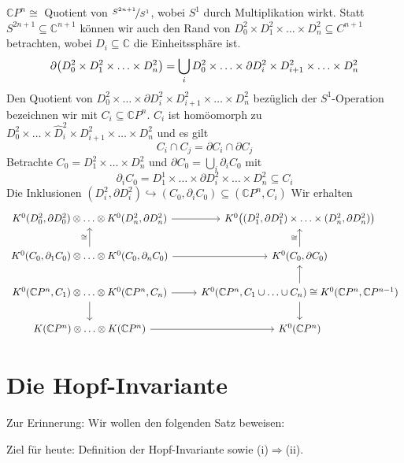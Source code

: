 $\mathds{C}P^n \cong$ Quotient von $\nicefrac{S^{2n+1}}{S^1}$, wobei $S^1$ durch Multiplikation wirkt. Statt $S^{2n+1} \subseteq \mathds{C}^{n+1}$ können wir auch den Rand
von $D_0^2 \times D_1^2 \times \ldots \times D_n^2 \subseteq C^{n+1}$ betrachten, wobei $D_i \subseteq \mathds{C}$ die Einheitssphäre ist.
\[
	\partial \enbrace*{D_0^2 \times D_1^2 \times \ldots \times D_n^2} = \bigcup_i D_0^2 \times \ldots \times \partial D_i^2 \times D_{i+1}^2 \times \ldots \times D_n^2 
\]
Den Quotient von $D_0^2 \times \ldots \times \partial D_i^2 \times D_{i+1}^2 \times \ldots \times D_n^2 $ bezüglich der $S^1$-Operation bezeichnen wir mit 
$C_i \subseteq \mathds{C}P^n$. $C_i$ ist homöomorph zu $D_0^2 \times \ldots \times \hat{D}_i^2 \times D_{i+1}^2 \times \ldots \times D_n^2 $ und es gilt
\[
	C_i \cap C_j = \partial C_i \cap \partial C_j
\]
Betrachte $C_0 = D_1^2 \times \ldots \times D_n^2$ und $\partial C_0 = \bigcup_i \partial_i C_0$ mit 
\[
	\partial_i C_0 = D_1^1 \times \ldots \times \partial D_i^2 \times \ldots \times D_n^2 \subseteq C_i
\]
Die Inklusionen $(D_i^2,\partial D_i^2) \hookrightarrow (C_0,\partial_i C_0) \subseteq (\mathds{C}P^n,C_i)$ Wir erhalten 
\[
	\begin{tikzcd}
			K^0(D^2_0,\partial D_0^2) \otimes  \ldots \otimes K^0(D_n^2,\partial D_n^2) \rar 
			& K^0 \enbrace*{ (D_1^2,\partial D_1^2) \times \ldots \times (D_n^2, \partial D_n^2)} \\
			K^0(C_0,\partial_1 C_0) \otimes \ldots \otimes K^0(C_0,\partial_n C_0) \rar \uar["\cong"] & K^0(C_0,\partial C_0) \uar["\cong"] \\
			K^0(\mathds{C}P^n,C_1) \otimes \ldots \otimes K^0(\mathds{C}P^n,C_n) \rar \dar & K^0(\mathds{C}P^n, C_1 \cup \ldots \cup C_n) \cong 
			K^0(\mathds{C}P^n,\mathds{C}P^{n-1}) \dar \uar\\
			K(\mathds{C}P^n) \otimes \ldots \otimes K(\mathds{C}P^n) \rar & K^0(\mathds{C}P^n)
	\end{tikzcd}
\]
\newpage

\section{Die Hopf-Invariante} %
\label{sec:die_hopf_invariante}
Zur Erinnerung: Wir wollen den folgenden Satz beweisen:

\Adams*
\noindent Ziel für heute: Definition der Hopf-Invariante sowie (i)$\Rightarrow $(ii).


